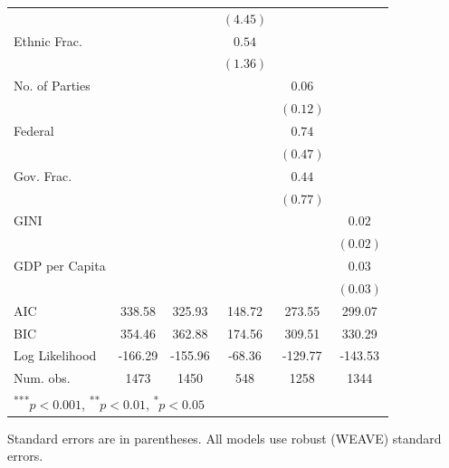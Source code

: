 \documentclass[a4paper]{article}\usepackage{graphicx, color}
\begin{document}
\begin{table}
\begin{center}
\begin{tabular}{l c c c c c }
                       &               &               & $(4.45)$     &              &              \\
Ethnic Frac.           &               &               & $0.54$       &              &              \\
                       &               &               & $(1.36)$     &              &              \\
No. of Parties         &               &               &              & $0.06$       &              \\
                       &               &               &              & $(0.12)$     &              \\
Federal                &               &               &              & $0.74$       &              \\
                       &               &               &              & $(0.47)$     &              \\
Gov. Frac.             &               &               &              & $0.44$       &              \\
                       &               &               &              & $(0.77)$     &              \\
GINI                   &               &               &              &              & $0.02$       \\
                       &               &               &              &              & $(0.02)$     \\
GDP per Capita         &               &               &              &              & $0.03$       \\
                       &               &               &              &              & $(0.03)$     \\
\hline
AIC                    & 338.58        & 325.93        & 148.72       & 273.55       & 299.07       \\
BIC                    & 354.46        & 362.88        & 174.56       & 309.51       & 330.29       \\
Log Likelihood         & -166.29       & -155.96       & -68.36       & -129.77      & -143.53      \\
Num. obs.              & 1473          & 1450          & 548          & 1258         & 1344         \\
\hline
\multicolumn{6}{l}{\scriptsize{\textsuperscript{***}$p<0.001$, 
  \textsuperscript{**}$p<0.01$, 
  \textsuperscript{*}$p<0.05$}}
\end{tabular}


\end{center}
{\scriptsize{
    Standard errors are in parentheses. All models use robust (WEAVE) standard errors. \\
}}
\end{table}
\end{document}
